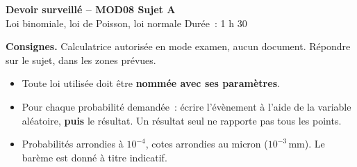 \documentclass[a4paper,11pt]{article}
\begin{document}
\begin{tcolorbox}[colback=uimmred, colframe=uimmred, sharp corners, boxrule=0pt,
  left=14pt, right=14pt, top=10pt, bottom=10pt]
{\color{white}\LARGE\bfseries Devoir surveillé -- MOD08 \hfill Sujet A}\\[4pt]
{\color{white}\large Loi binomiale, loi de Poisson, loi normale \hfill Durée~: 1 h 30}
\end{tcolorbox}

\vspace{2pt}

\begin{consigne}
\textbf{Consignes.} Calculatrice autorisée en mode examen, aucun document. Répondre sur le sujet, dans les zones prévues.
\begin{itemize}[leftmargin=12pt, itemsep=1pt, topsep=2pt]
  \item Toute loi utilisée doit être \textbf{nommée avec ses paramètres}.
  \item Pour chaque probabilité demandée~: écrire l'évènement à l'aide de la variable aléatoire, \textbf{puis} le résultat. Un résultat seul ne rapporte pas tous les points.
  \item Probabilités arrondies à $10^{-4}$, cotes arrondies au micron ($10^{-3}$\,mm). Le barème est donné à titre indicatif.
\end{itemize}
\end{consigne}
\end{document}
